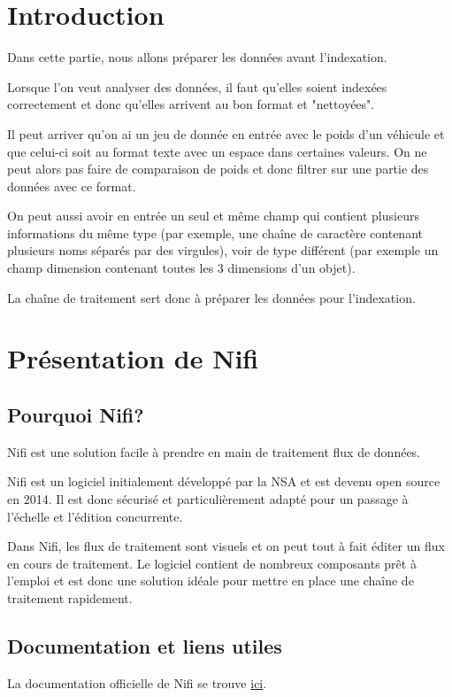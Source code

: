 \documentclass[11pt,letterpaper]{article}
\begin{document}
	\pagestyle{fancy}

	\section*{Introduction}
	Dans cette partie, nous allons préparer les données avant l'indexation.
	
	Lorsque l'on veut analyser des données, il faut qu'elles soient indexées correctement et donc qu'elles arrivent au bon format et "nettoyées".
	
	Il peut arriver qu'on ai un jeu de donnée en entrée avec le poids d'un véhicule et que celui-ci soit au format texte avec un espace dans certaines valeurs. On ne peut alors pas faire de comparaison de poids et donc filtrer sur une partie des données avec ce format.
	
	On peut aussi avoir en entrée un seul et même champ qui contient plusieurs informations du même type (par exemple, une chaîne de caractère contenant plusieurs noms séparés par des virgules), voir de type différent (par exemple un champ dimension contenant toutes les 3 dimensions d'un objet).
	
	La chaîne de traitement sert donc à préparer les données pour l'indexation.
	\section*{Présentation de Nifi}
	\subsection*{Pourquoi Nifi?}
	Nifi est une solution facile à prendre en main de traitement flux de données.
	
	Nifi est un logiciel initialement développé par la NSA et est devenu open source en 2014. Il est donc sécurisé et particulièrement adapté pour un passage à l'échelle et l'édition concurrente.
	
	Dans Nifi, les flux de traitement sont visuels et on peut tout à fait éditer un flux en cours de traitement. Le logiciel contient de nombreux composants prêt à l'emploi et est donc une solution idéale pour mettre en place une chaîne de traitement rapidement.
	\subsection*{Documentation et liens utiles}
	La documentation officielle de Nifi se trouve \href{https://nifi.apache.org/docs/nifi-docs/html/getting-started.html}{ici}. 
	
\end{document}
